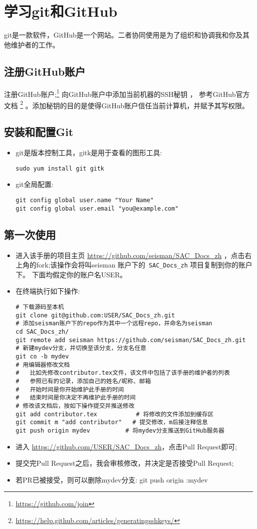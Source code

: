\section{学习git和GitHub}
git是一款软件，GitHub是一个网站。二者协同使用是为了组织和协调我和你及其他维护者的工作。
\subsection{注册GitHub账户}
注册GitHub账户;\footnote{\url{https://github.com/join}}
向GitHub账户中添加当前机器的SSH秘钥 ， 参考GitHub官方文档
\footnote{\url{https://help.github.com/articles/generating­ssh­keys/}}
。添加秘钥的目的是使得GitHub账户信任当前计算机，并赋予其写权限。
\subsection{安装和配置Git}
\begin{itemize}
\item git是版本控制工具，gitk是用于查看的图形工具:
\begin{verbatim}
sudo yum install git gitk
\end{verbatim}
\item git全局配置:
\begin{verbatim}
git config ­­global user.name "Your Name"
git config ­­global user.email "you@example.com"
\end{verbatim}
\end{itemize}
\subsection{第一次使用}
\begin{itemize}
\item 进入该手册的项目主页 \url{https://github.com/seisman/SAC_Docs_zh}
，点击右上角的fork;该操作会将叫seisman 账户下的~\verb+SAC_Docs_zh+ 项目复制到你的账户下。
下面均假定你的账户名USER。
\item 在终端执行如下操作:
\begin{verbatim}
# 下载源码至本机
git clone git@github.com:USER/SAC_Docs_zh.git
# 添加seisman账户下的repo作为其中一个远程repo，并命名为seisman
cd SAC_Docs_zh/
git remote add seisman https://github.com/seisman/SAC_Docs_zh.git
# 新建mydev分支，并切换至该分支，分支名任意
git co -­b mydev
# 用编辑器修改文档
#   比如先修改contributor.tex文件，该文件中包括了该手册的维护者的列表
#   参照已有的记录，添加自己的姓名/昵称、邮箱
#   开始时间是你开始维护此手册的时间
#   结束时间是你决定不再维护此手册的时间
# 修改该文档后，按如下操作提交并推送修改
git add contributor.tex           # 将修改的文件添加到缓存区
git commit ­m "add contributor"   # 提交修改，­m后接注释信息
git push origin mydev          # 将mydev分支推送到GitHub服务器
\end{verbatim}
\item 进入 \url{https://github.com/USER/SAC_Docs_zh}，点击Pull Request即可;
\item 提交完Pull Request之后，我会审核修改，并决定是否接受Pull Request;
\item 若PR已被接受，则可以删除mydev分支:
git push origin :mydev
\end{itemize}
